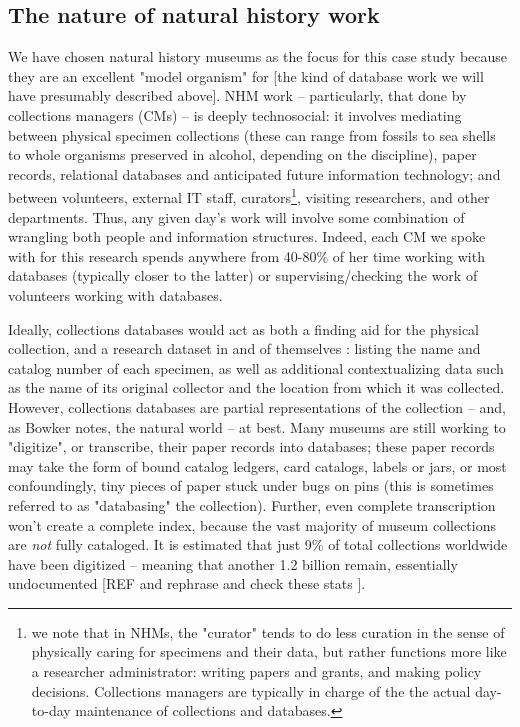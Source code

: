 \subsection{The nature of natural history work}

We have chosen natural history museums as the focus for this case study because they are an excellent "model organism" for [the kind of database work we will have presumably described above]. NHM work -- particularly, that done by collections managers (CMs) -- is deeply technosocial: it involves mediating between physical specimen collections (these can range from fossils to sea shells to whole organisms preserved in alcohol, depending on the discipline), paper records, relational databases and anticipated future information technology; and between volunteers, external IT staff, curators\footnote{we note that in NHMs, the "curator" tends to do less curation in the sense of physically caring for specimens and their data, but rather functions more like a researcher administrator: writing papers and grants, and making policy decisions. Collections managers are typically in charge of the the actual day-to-day maintenance of collections and databases.}, visiting researchers, and other departments. Thus, any given day’s work will involve some combination of wrangling both people and information structures. Indeed, each CM we spoke with for this research spends anywhere from 40-80\% of her time working with databases (typically closer to the latter) or supervising/checking the work of volunteers working with databases.

Ideally, collections databases would act as both a finding aid for the physical collection, and a research dataset in and of themselves \cite{Chapman2005}: listing the name and catalog number of each specimen, as well as additional contextualizing data such as the name of its original collector and the location from which it was collected. However, collections databases are partial representations of the collection -- and, as Bowker notes, the natural world \cite{Bowker_2000} -- at best. Many museums are still working to "digitize", or transcribe, their paper records into databases; these paper records may take the form of bound catalog ledgers, card catalogs, labels or jars, or most confoundingly, tiny pieces of paper stuck under bugs on pins \cite{Beaman_2012} (this is sometimes referred to as "databasing" the collection). Further, even complete transcription won't create a complete index, because the vast majority of museum collections are \textit{not} fully cataloged. It is estimated that just 9\% of total collections worldwide have been digitized -- meaning that another 1.2 billion remain, essentially undocumented [REF and rephrase and check these stats \cite{Ari_o_2010}].

